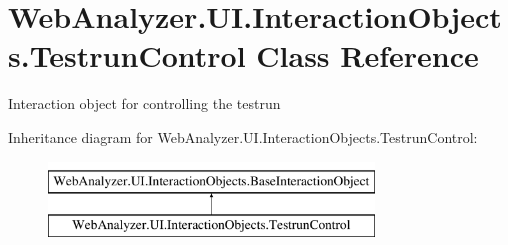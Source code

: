 \hypertarget{class_web_analyzer_1_1_u_i_1_1_interaction_objects_1_1_testrun_control}{}\section{Web\+Analyzer.\+U\+I.\+Interaction\+Objects.\+Testrun\+Control Class Reference}
\label{class_web_analyzer_1_1_u_i_1_1_interaction_objects_1_1_testrun_control}


Interaction object for controlling the testrun  


Inheritance diagram for Web\+Analyzer.\+U\+I.\+Interaction\+Objects.\+Testrun\+Control\+:\begin{figure}[H]
\begin{center}
\leavevmode
\includegraphics[height=2.000000cm]{class_web_analyzer_1_1_u_i_1_1_interaction_objects_1_1_testrun_control}
\end{center}
\end{figure}
